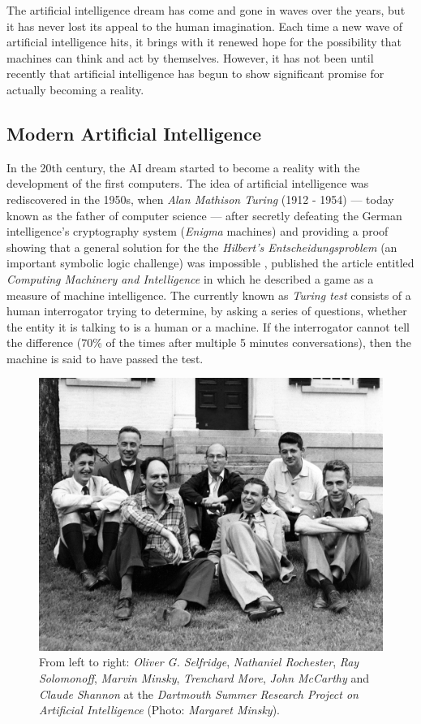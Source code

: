 The artificial intelligence dream has come and gone in waves over the years, but it has never lost its appeal to the human imagination. Each time a new wave of artificial intelligence hits, it brings with it renewed hope for the possibility that machines can think and act by themselves. However, it has not been until recently that artificial intelligence has begun to show significant promise for actually becoming a reality.

\subsection{Modern Artificial Intelligence}
In the 20th century, the AI dream started to become a reality with the development of the first computers. The idea of artificial intelligence was rediscovered in the 1950s, when \textit{Alan Mathison Turing} (1912 - 1954) — today known as the father of computer science — after secretly defeating the German intelligence's cryptography system (\textit{Enigma} machines) \autocite{Hodges:2000} and providing a proof showing that a general solution for the the \textit{Hilbert's Entscheidungsproblem} (an important symbolic logic challenge) was impossible \autocite{turing1936}, published the article entitled \textit{Computing Machinery and Intelligence} \autocite{turing1950} in which he described a game as a measure of machine intelligence. The currently known as \textit{Turing test} consists of a human interrogator trying to determine, by asking a series of questions, whether the entity it is talking to is a human or a machine. If the interrogator cannot tell the difference (70\% of the times after multiple 5 minutes conversations), then the machine is said to have passed the test.

\begin{figure}
	\centering
	\includegraphics[width=.6\textwidth]{chapter1/images/dartmouth}
	\caption{From left to right: \textit{Oliver G. Selfridge}, \textit{Nathaniel Rochester}, \textit{Ray Solomonoff}, \textit{Marvin Minsky}, \textit{Trenchard More}, \textit{John McCarthy} and \textit{Claude Shannon} at the \textit{Dartmouth Summer Research Project on Artificial Intelligence} (Photo: \textit{Margaret Minsky}).}
	\label{fig:dartmouth_photo}
\end{figure}

